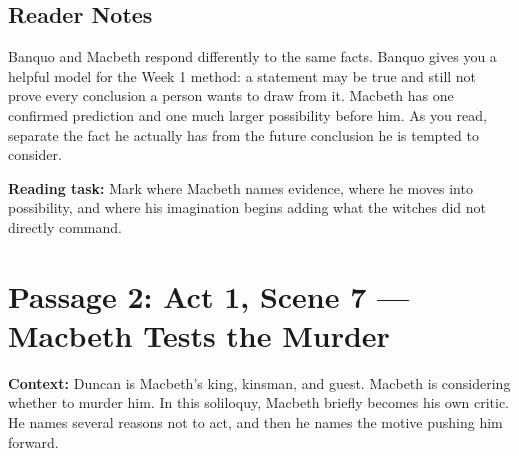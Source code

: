 \documentclass[12pt]{article}
\begin{document}
\subsection*{Reader Notes}

Banquo and Macbeth respond differently to the same facts. Banquo gives you a helpful model for the Week 1 method: a statement may be true and still not prove every conclusion a person wants to draw from it. Macbeth has one confirmed prediction and one much larger possibility before him. As you read, separate the fact he actually has from the future conclusion he is tempted to consider.

\textbf{Reading task:} Mark where Macbeth names evidence, where he moves into possibility, and where his imagination begins adding what the witches did not directly command.

\newpage

\section*{Passage 2: Act 1, Scene 7 — Macbeth Tests the Murder}

\textbf{Context:} Duncan is Macbeth's king, kinsman, and guest. Macbeth is considering whether to murder him. In this soliloquy, Macbeth briefly becomes his own critic. He names several reasons not to act, and then he names the motive pushing him forward.
\end{document}
